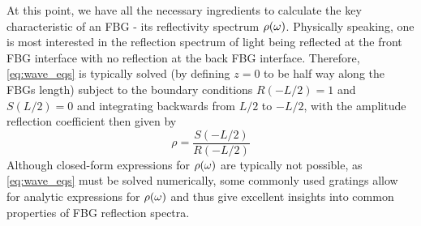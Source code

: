 %
\par
%
At this point, we have all the necessary ingredients to calculate the key characteristic of an FBG - its reflectivity spectrum $\rho(\omega)$. 
Physically speaking, one is most interested in the reflection spectrum of light being reflected at the front FBG interface with no reflection at the back FBG interface. 
Therefore, \eqref{eq:wave_eqs} is typically solved (by defining $z=0$ to be half way along the FBGs length) subject to the boundary conditions $R(-L/2)=1$ and $S(L/2)=0$ and integrating backwards from $L/2$ to $-L/2$, 
with the amplitude reflection coefficient then given by
%
\begin{equation}
\label{eq:rho}
    \rho = \frac{S(-L/2)}{R(-L/2)}
\end{equation}
%
Although closed-form expressions for $\rho(\omega)$ are typically not possible, as \eqref{eq:wave_eqs} must be solved numerically, 
some commonly used gratings allow for analytic expressions for $\rho(\omega)$ and thus give excellent insights into common properties of FBG reflection spectra.
%
%
